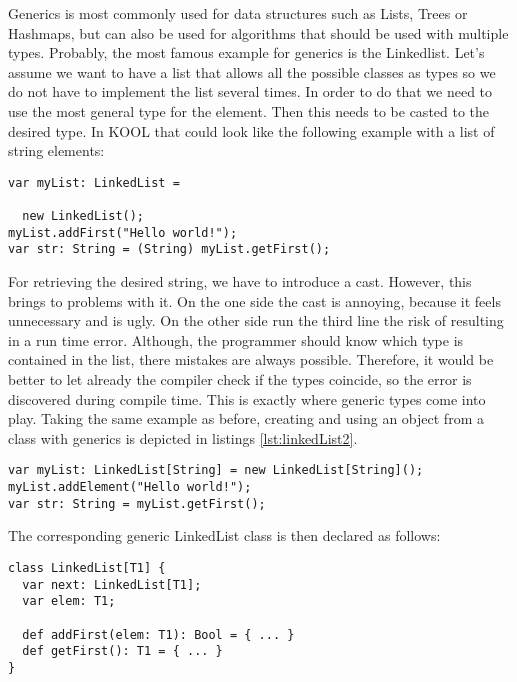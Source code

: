 Generics is most commonly used for data structures such as Lists, Trees or Hashmaps, but can also be used for algorithms that should be used with multiple types. Probably, the most famous example for generics is the Linkedlist. Let's assume we want to have a list that allows all the possible classes as types so we do not have to implement the list several times. In order to do that we need to use the most general type for the element. Then this needs to be casted to the desired type. In KOOL that could look like the following example with a list of string elements:

\begin{lstlisting}
var myList: LinkedList = 

  new LinkedList(); 
myList.addFirst("Hello world!"); 
var str: String = (String) myList.getFirst(); 
\end{lstlisting}

For retrieving the desired string, we have to introduce a cast. However, this brings to problems with it. On the one side the cast is annoying, because it feels unnecessary and is ugly. On the other side run the third line the risk of resulting in a run time error. Although, the programmer should know which type is contained in the list, there mistakes are always possible. Therefore, it would be better to let already the compiler check if the types coincide, so the error is discovered during compile time. This is exactly where generic types come into play. Taking the same example as before, creating and using an object from a class with generics is depicted in listings \ref{lst:linkedList2}.

\begin{lstlisting}[caption={LinkedList},label={lst:linkedList2}]
var myList: LinkedList[String] = new LinkedList[String]();
myList.addElement("Hello world!");
var str: String = myList.getFirst();
\end{lstlisting}

The corresponding generic LinkedList class is then declared as follows:

\begin{lstlisting}
class LinkedList[T1] {
  var next: LinkedList[T1];
  var elem: T1;
	
  def addFirst(elem: T1): Bool = { ... }
  def getFirst(): T1 = { ... }
}
\end{lstlisting}
